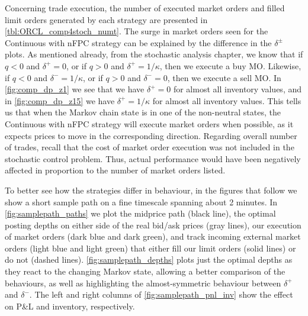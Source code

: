 Concerning trade execution, the number of executed market orders and filled limit orders generated by each strategy are presented in \autoref{tbl:ORCL_comp4stoch_numt}. The surge in market orders seen for the Continuous with nFPC strategy can be explained by the difference in the $\delta^\pm$ plots. As mentioned already, from the stochastic analysis chapter, we know that if $q < 0 $ and $\delta^+ =0$, or if $q > 0$ and $\delta^+ = 1/\kappa$, then we execute a buy MO. Likewise, if $q < 0 $ and $\delta^- =1/\kappa$, or if $q > 0$ and $\delta^- = 0$, then we execute a sell MO. In \autoref{fig:comp_dp_z1} we see that we have $\delta^+ = 0$ for almost all inventory values, and in \autoref{fig:comp_dp_z15} we have  $\delta^+ = 1/\kappa$ for almost all inventory values. This tells us that when the Markov chain state is in one of the non-neutral states, the Continuous with nFPC strategy will execute market orders when possible, as it expects prices to move in the corresponding direction. Regarding overall number of trades, recall that the cost of market order execution was not included in the stochastic control problem. Thus, actual performance would have been negatively affected in proportion to the number of market orders listed.

To better see how the strategies differ in behaviour, in the figures that follow we show a short sample path on a fine timescale spanning about 2 minutes. In \autoref{fig:samplepath_paths} we plot the midprice path (black line), the optimal posting depths on either side of the real bid/ask prices (gray lines), our execution of market orders (dark blue and dark green), and track incoming external market orders (light blue and light green) that either fill our limit orders (solid lines) or do not (dashed lines). \autoref{fig:samplepath_depths} plots just the optimal depths as they react to the changing Markov state, allowing a better comparison of the behaviours, as well as highlighting the almost-symmetric behaviour between $\delta^+$ and $\delta^-$. The left and right columns of \autoref{fig:samplepath_pnl_inv} show the effect on P\&L and inventory, respectively. 

